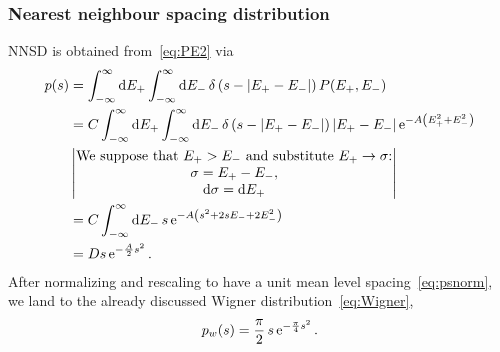\documentclass[a4paper,11pt,twoside]{article}
\begin{document}
        \subsubsection{Nearest neighbour spacing distribution}
            NNSD is obtained from~\eqref{eq:PE2} via
            \begin{align}
                p(s)&=\int_{-\infty}^{\infty}\mathrm{d} E_{+}\int_{-\infty}^{\infty}\mathrm{d} E_{-}\,\delta\left(s-\left|{E_{+}-E_{-}}\right|\right)P(E_{+},E_{-})\nonumber\\
                    &=C\int_{-\infty}^{\infty}\mathrm{d} E_{+}\int_{-\infty}^{\infty}\mathrm{d} E_{-}\,\delta\left(s-\left|{E_{+}-E_{-}}\right|\right)\left|{E_{+}-E_{-}}\right|\operatorname{e}^{-A\left(E_{+}^{2}+E_{-}^{2}\right)}\nonumber\\
                    &\begin{vmatrix}\text{We suppose that $E_{+}>E_{-}$ and substitute $E_{+}\rightarrow\sigma$:} \\
                        \sigma=E_{+}-E_{-},\\
                        \mathrm{d}\sigma=\mathrm{d} E_{+}\end{vmatrix}\nonumber\\
                    &=C\int_{-\infty}^{\infty}\mathrm{d} E_{-}\,s\operatorname{e}^{-A\left(s^{2}+2sE_{-}+2E_{-}^{2}\right)}\nonumber\\
                    &=Ds\operatorname{e}^{-\frac{A}{2}s^{2}}.
            \end{align} 
            After normalizing and rescaling to have a unit mean level spacing~\eqref{eq:psnorm}, we land to the already discussed Wigner distribution~\eqref{eq:Wigner},
            \begin{equation}\label{eq:Wigner1}
                p_{w}(s)=\frac{\pi}{2}\,s\operatorname{e}^{-\frac{\pi}{4}s^{2}}.
            \end{equation}
\end{document}
